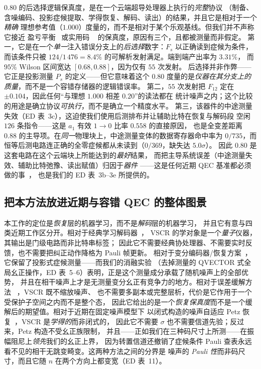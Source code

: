 \documentclass[11pt,a4paper]{article}
\begin{document}
$0.80$ 的后选择逻辑保真度，是在一个云端超导处理器上执行的\emph{完整}协议
（制备、含噪编码、投影症候提取、学得恢复、解码、读出）的结果，并且它是相对于一个\emph{精确}
理想参考值（$1.000$）度量的，而不是相对于某个乐观基线。但我们并不声称它接近
盈亏平衡~\cite{google_below_threshold,sivak_breakeven,brock_qudits} 或实用码
~\cite{bravyi_bb,bluvstein_atoms} 的保真度，原因有三个，且都被测量而非假定。
第一，它是在一个\emph{单一}注入错误分支上的\emph{后选择}数字：$F_s$ 以正确读到症候为条件，
而该条件只被 $124/1\,476=8.4\%$ 的可解析发射满足。端到端产出率为 $3.31\%$，
而 $95\%$ Wilson 区间宽达 $[0.68,0.88]$，因为仅有 $55$ 次发射。
后选择并非作弊——它正是投影测量 $P_s$ 的定义——但它意味着这个 $0.80$
度量的是\emph{仪器在其分支上的质量}，而不是一个容错存储器的逻辑错误率。
第二，$55$ 次发射把 $F_{12}$ 定在 $\pm0.104$，因此任何“与理想 $1.000$ 相差 $0.20$”的读法都在
统计噪声之内；这个比较的用途是确立协议\emph{可执行}，而不是确立一个精度水平。
第三，该器件的中途测量失效（ED 表~3c），这迫使我们使用后测排布并让辅助比特在恢复与解码段
空闲 $126$ 条指令——这是 $a_1$ 有效 $1\to0$ 比率 $0.558$ 的直接原因，
也是全变差距离 $0.88$ 的主导项。在\emph{同一}物理块上，中途测量变体的数据寄存器命中率为
$0/735$，而恒等后测电路连正确的全零症候都从未读到（$0/369$，缺失达 $5.0\sigma$）。
因此 $0.80$ 是这套电路在这个云端块上所能达到的\emph{最好}结果，
而把主导系统误差（中途测量失效、辅助比特弛豫、读出赋值）归因于\emph{器件}
——这是任何近期 QEC 基准都必须做的事~\cite{ryan_anderson_rt,honciuc_832}，
也是我们的 ED 表~3b--3e 所提供的。

\subsection*{把本方法放进近期与容错 QEC 的整体图景}

本工作的定位是\emph{恢复}层的机器学习，而不是\emph{解码}层的机器学习，
并且它有意与四类近期工作区分开。相对于经典学习解码器~\cite{torlai_nn,bausch_ml,tian_transformer}，
VSCR 的学对象是一个\emph{量子}仪器，其输出是门级电路而非比特串标签；
因此它不需要经典协处理器、不需要实时反馈，也不需要把纠正动作降格为 Pauli 帧更新。
相对于变分编码器/恢复方案~\cite{johnson_qvector,varqec_cao,varqec_meyer}，
它保留了投影式症候测量——而我们的消融实验
（去掉测量的 QVECTOR 式全局幺正操作，ED 表~5--6）表明，正是这个测量成分承载了随机噪声上的全部优势，
并且在相干噪声上才是无测量变分幺正有竞争力的地方。相对于误差缓解方法
~\cite{temme_zne,huggins_vd,czarnik_cdr,cai_em_review}，VSCR 既不缩放噪声、
也不需要多副本或完整层析，代价是它作用于一个受保护子空间之内而不是整个态，
因此它给出的是一个\emph{恢复保真度}而不是一个缓解后的期望值。相对于近期在固定噪声模型下
以闭式构造的噪声自适应 Petz 恢复~\cite{biswas_syndrome_petz}，VSCR 是\emph{学得的}而非闭式的，
因此它不需要 $\sigma$ 也不需要信道先验；反过来，Petz 构造不受幺正族限制，
并且——正如我们在三种码尺寸上所测——在振幅阻尼上\emph{领先}我们的幺正上界，
因为转置信道还撤销了症候条件 Pauli 查表永远看不见的相干无跳变畸变。这两种方法之间的分界是
噪声的 \emph{Pauli 性}而非码尺寸，而且它随 $n$ 在两个方向上都变宽（ED 表~11）。
\end{document}
